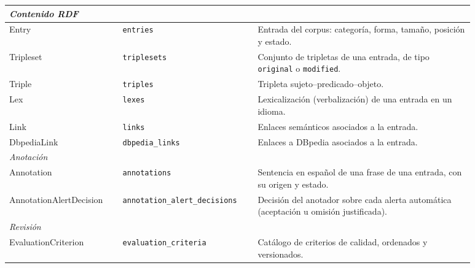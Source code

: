 \begin{longtable}{|p{0.22\linewidth}|p{0.24\linewidth}|p{0.42\linewidth}|}
	\multicolumn{3}{|l|}{\textit{Contenido RDF}}                                                                                                                            \\ \hline
	Entry                   & \texttt{entries}                      & Entrada del corpus: categoría, forma, tamaño, posición y estado.                                      \\ \hline
	Tripleset               & \texttt{triplesets}                   & Conjunto de tripletas de una entrada, de tipo \texttt{original} o \texttt{modified}.                  \\ \hline
	Triple                  & \texttt{triples}                      & Tripleta sujeto--predicado--objeto.                                                                   \\ \hline
	Lex                     & \texttt{lexes}                        & Lexicalización (verbalización) de una entrada en un idioma.                                           \\ \hline
	Link                    & \texttt{links}                        & Enlaces semánticos asociados a la entrada.                                                            \\ \hline
	DbpediaLink             & \texttt{dbpedia\_links}               & Enlaces a DBpedia asociados a la entrada.                                                             \\ \hline
	\multicolumn{3}{|l|}{\textit{Anotación}}                                                                                                                                \\ \hline
	Annotation              & \texttt{annotations}                  & Sentencia en español de una frase de una entrada, con su origen y estado.                             \\ \hline
	AnnotationAlertDecision & \texttt{annotation\_alert\_decisions} & Decisión del anotador sobre cada alerta automática (aceptación u omisión justificada).                \\ \hline
	\multicolumn{3}{|l|}{\textit{Revisión}}                                                                                                                                 \\ \hline
	EvaluationCriterion     & \texttt{evaluation\_criteria}         & Catálogo de criterios de calidad, ordenados y versionados.                                            \\ \hline

\end{longtable}
